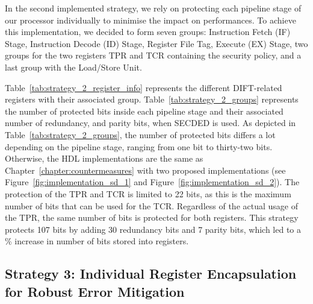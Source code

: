 In the second implemented strategy, we rely on protecting each pipeline stage of our processor individually to minimise the impact on performances. To achieve this implementation, we decided to form seven groups: Instruction Fetch (IF) Stage, Instruction Decode (ID) Stage, Register File Tag, Execute (EX) Stage, two groups for the two registers TPR and TCR containing the security policy, and a last group with the Load/Store Unit. 

Table~\ref{tab:strategy_2_register_info} represents the different DIFT-related registers with their associated group.
Table~\ref{tab:strategy_2_groups} represents the number of protected bits inside each pipeline stage and their associated number of redundancy, and parity bits, when SECDED is used. As depicted in Table~\ref{tab:strategy_2_groups}, the number of protected bits differs a lot depending on the pipeline stage, ranging from one bit to thirty-two bits.
Otherwise, the HDL implementations are the same as Chapter~\ref{chapter:countermeasures} with two proposed implementations (see Figure~\ref{fig:implementation_sd_1} and Figure~\ref{fig:implementation_sd_2}). The protection of the TPR and TCR is limited to 22 bits, as this is the maximum number of bits that can be used for the TCR. Regardless of the actual usage of the TPR, the same number of bits is protected for both registers. This strategy protects 107 bits by adding 30 redundancy bits and 7 parity bits, which led to a \% increase in number of bits stored into registers.

\subsection{Strategy 3: Individual Register Encapsulation for Robust Error Mitigation}

